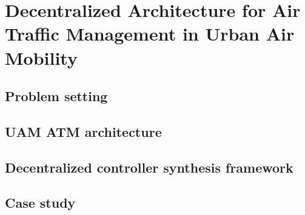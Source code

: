 








%




\chapter{Decentralized Architecture for Air Traffic Management in Urban Air Mobility}%


\section {Problem setting}

%
\section{UAM ATM architecture} \label{sec:Motivation}




\section{Decentralized controller synthesis framework}\label{sec:distshield}

%
%
\section{Case study}\label{sec:experiments}



